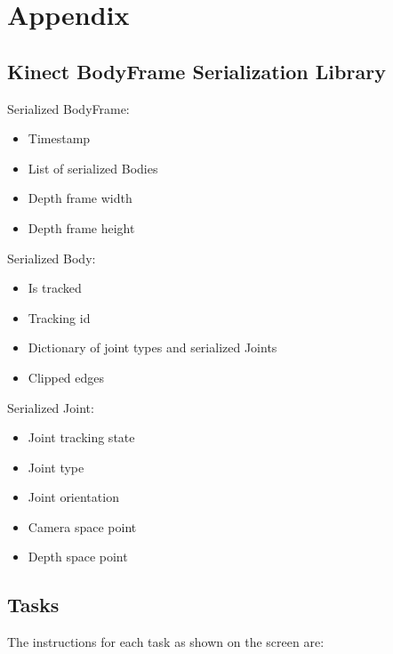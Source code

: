 


\chapter{Appendix}

\label{chapter:appendix}

\section{Kinect BodyFrame Serialization Library}
\label{sec:appendix_bodyframe_serialization}

Serialized BodyFrame:

\begin{itemize}
  \item Timestamp
  \item List of serialized Bodies
  \item Depth frame width
  \item Depth frame height
\end{itemize}

Serialized Body:

\begin{itemize}
  \item Is tracked
  \item Tracking id
  \item Dictionary of joint types and serialized Joints
  \item Clipped edges
\end{itemize}

Serialized Joint:

\begin{itemize}
  \item Joint tracking state
  \item Joint type
  \item Joint orientation
  \item Camera space point
  \item Depth space point
\end{itemize}

\section{Tasks}
\label{sec:appendix_tasks}

The instructions for each task as shown on the screen are:

